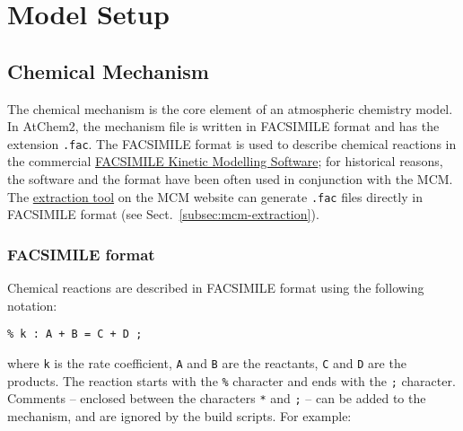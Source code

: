 %
%
%
%

\chapter{Model Setup} \label{ch:setup}

\section{Chemical Mechanism} \label{sec:chemical-mechanism}

The chemical mechanism is the core element of an atmospheric chemistry
model. In AtChem2, the mechanism file is written in FACSIMILE format
and has the extension \texttt{.fac}. The FACSIMILE format is used to
describe chemical reactions in the commercial
\href{http://www.mcpa-software.com/}{FACSIMILE Kinetic Modelling Software};
for historical reasons, the software and the format have been
often used in conjunction with the MCM. The
\href{http://mcm.leeds.ac.uk/MCM/extract.htt}{extraction tool} on the
MCM website can generate \texttt{.fac} files directly in FACSIMILE
format (see Sect.~\ref{subsec:mcm-extraction}).

\subsection{FACSIMILE format} \label{subsec:facsimile-format}

Chemical reactions are described in FACSIMILE format using the
following notation:

\begin{verbatim}
% k : A + B = C + D ;
\end{verbatim}

where \texttt{k} is the rate coefficient, \texttt{A} and \texttt{B}
are the reactants, \texttt{C} and \texttt{D} are the products. The
reaction starts with the \texttt{\%} character and ends with the
\texttt{;} character. Comments -- enclosed between the characters
\texttt{*} and \texttt{;} -- can be added to the mechanism, and are
ignored by the build scripts. For example:


